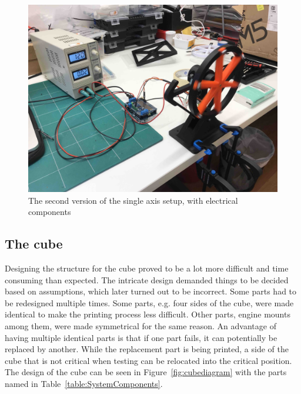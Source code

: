 \begin{figure}
    \centering
    \includegraphics[width=.8\linewidth]{figures/SingleAxisV2Front.jpg}
    \caption{The second version of the single axis setup, with electrical components}
    \label{fig:SingleAxisV2}
\end{figure}

\subsection{The cube}
Designing the structure for the cube proved to be a lot more difficult and time consuming than expected. The intricate design demanded things to be decided based on assumptions, which later turned out to be incorrect. Some parts had to be redesigned multiple times. Some parts, e.g. four sides of the cube, were made identical to make the printing process less difficult. Other parts, engine mounts among them, were made symmetrical for the same reason. An advantage of having multiple identical parts is that if one part fails, it can potentially be replaced by another. While the replacement part is being printed, a side of the cube that is not critical when testing can be relocated into the critical position. The design of the cube can be seen in Figure~\ref{fig:cubediagram} with the parts named in Table~\ref{table:SystemComponents}.


